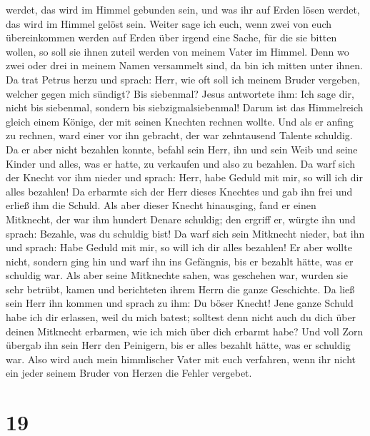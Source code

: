 werdet, das wird im Himmel gebunden sein, und was ihr auf Erden lösen
werdet, das wird im Himmel gelöst sein.  Weiter sage ich
euch, wenn zwei von euch übereinkommen werden auf Erden über irgend eine
Sache, für die sie bitten wollen, so soll sie ihnen zuteil werden von
meinem Vater im Himmel.  Denn wo zwei oder drei in meinem
Namen versammelt sind, da bin ich mitten unter ihnen.  Da
trat Petrus herzu und sprach: Herr, wie oft soll ich meinem Bruder
vergeben, welcher gegen mich sündigt? Bis siebenmal? 
Jesus antwortete ihm: Ich sage dir, nicht bis siebenmal, sondern bis
siebzigmalsiebenmal!  Darum ist das Himmelreich gleich
einem Könige, der mit seinen Knechten rechnen wollte. 
Und als er anfing zu rechnen, ward einer vor ihn gebracht, der war
zehntausend Talente schuldig.  Da er aber nicht bezahlen
konnte, befahl sein Herr, ihn und sein Weib und seine Kinder und alles,
was er hatte, zu verkaufen und also zu bezahlen.  Da warf
sich der Knecht vor ihm nieder und sprach: Herr, habe Geduld mit mir, so
will ich dir alles bezahlen!  Da erbarmte sich der Herr
dieses Knechtes und gab ihn frei und erließ ihm die Schuld.
 Als aber dieser Knecht hinausging, fand er einen
Mitknecht, der war ihm hundert Denare schuldig; den ergriff er, würgte
ihn und sprach: Bezahle, was du schuldig bist!  Da warf
sich sein Mitknecht nieder, bat ihn und sprach: Habe Geduld mit mir, so
will ich dir alles bezahlen!  Er aber wollte nicht,
sondern ging hin und warf ihn ins Gefängnis, bis er bezahlt hätte, was
er schuldig war.  Als aber seine Mitknechte sahen, was
geschehen war, wurden sie sehr betrübt, kamen und berichteten ihrem
Herrn die ganze Geschichte.  Da ließ sein Herr ihn kommen
und sprach zu ihm: Du böser Knecht! Jene ganze Schuld habe ich dir
erlassen, weil du mich batest;  solltest denn nicht auch
du dich über deinen Mitknecht erbarmen, wie ich mich über dich erbarmt
habe?  Und voll Zorn übergab ihn sein Herr den Peinigern,
bis er alles bezahlt hätte, was er schuldig war.  Also
wird auch mein himmlischer Vater mit euch verfahren, wenn ihr nicht ein
jeder seinem Bruder von Herzen die Fehler vergebet.

\hypertarget{section-18}{%
\section{19}\label{section-18}}


